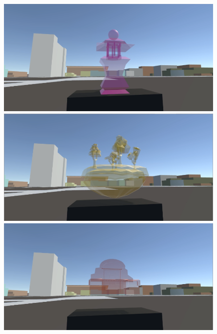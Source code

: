 \begin{appendices}
\begin{figure}
	\includegraphics[width=0.7\linewidth]{figures/tracing_shapes/finalstudy_shapes4}
	\par
	\includegraphics[width=0.7\linewidth]{figures/tracing_shapes/finalstudy_shapes5}
	\par
	\includegraphics[width=0.7\linewidth]{figures/tracing_shapes/finalstudy_shapes6}
	\par
\end{figure}
\begin{figure}
	\centering
	

\end{figure}
\end{appendices}
